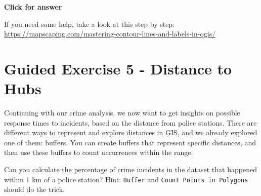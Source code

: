 \documentclass[
  letterpaper,
  DIV=11,
  numbers=noendperiod]{scrreprt}
\begin{document}
\begin{tcolorbox}[enhanced jigsaw, toprule=.15mm, breakable, left=2mm, colframe=quarto-callout-important-color-frame, colback=white, arc=.35mm, leftrule=.75mm, opacityback=0, rightrule=.15mm, bottomrule=.15mm]

\vspace{-3mm}\textbf{Click for answer}\vspace{3mm}

If you need some help, take a look at this step by step:
\url{https://mapscaping.com/mastering-contour-lines-and-labels-in-qgis/}

\end{tcolorbox}

\section{Guided Exercise 5 - Distance to
Hubs}\label{guided-exercise-5---distance-to-hubs}

Continuing with our crime analysis, we now want to get insights on
possible response times to incidents, based on the distance from police
stations. There are different ways to represent and explore distances in
GIS, and we already explored one of them: buffers. You can create
buffers that represent specific distances, and then use these buffers to
count occurrences within the range.

\begin{tcolorbox}[enhanced jigsaw, coltitle=black, toprule=.15mm, breakable, opacitybacktitle=0.6, left=2mm, colback=white, leftrule=.75mm, rightrule=.15mm, colbacktitle=quarto-callout-important-color!10!white, toptitle=1mm, titlerule=0mm, colframe=quarto-callout-important-color-frame, arc=.35mm, bottomtitle=1mm, opacityback=0, bottomrule=.15mm, title=\textcolor{quarto-callout-important-color}{\faExclamation}\hspace{0.5em}{Stop and Think}]

Can you calculate the percentage of crime incidents in the dataset that
happened within 1 km of a police station? Hint: \texttt{Buffer} and
\texttt{Count\ Points\ in\ Polygons} should do the trick.

\end{tcolorbox}
\end{document}
